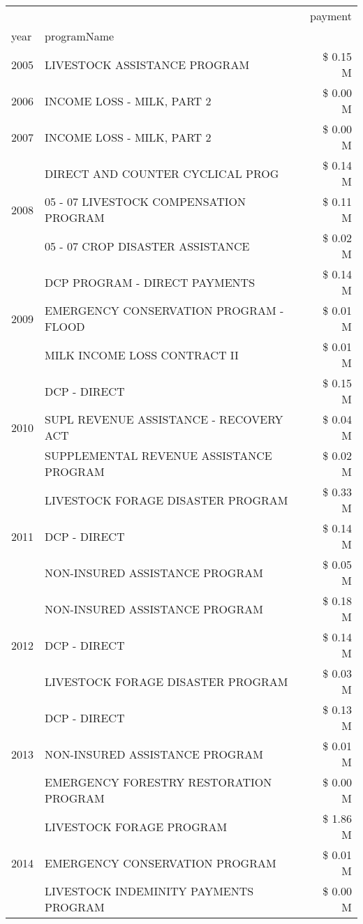 \begin{tabular}{llr}
\toprule
 &  & payment \\
year & programName &  \\
\midrule
2005 & LIVESTOCK ASSISTANCE PROGRAM & \$ 0.15 M \\
\cline{1-3}
2006 & INCOME LOSS - MILK, PART 2 & \$ 0.00 M \\
\cline{1-3}
2007 & INCOME LOSS - MILK, PART 2 & \$ 0.00 M \\
\cline{1-3}
\multirow[t]{3}{*}{2008} & DIRECT AND COUNTER CYCLICAL PROG & \$ 0.14 M \\
 & 05 - 07 LIVESTOCK COMPENSATION PROGRAM & \$ 0.11 M \\
 & 05 - 07 CROP DISASTER ASSISTANCE & \$ 0.02 M \\
\cline{1-3}
\multirow[t]{3}{*}{2009} & DCP PROGRAM - DIRECT PAYMENTS & \$ 0.14 M \\
 & EMERGENCY CONSERVATION PROGRAM - FLOOD & \$ 0.01 M \\
 & MILK INCOME LOSS CONTRACT II & \$ 0.01 M \\
\cline{1-3}
\multirow[t]{3}{*}{2010} & DCP - DIRECT & \$ 0.15 M \\
 & SUPL REVENUE ASSISTANCE - RECOVERY ACT & \$ 0.04 M \\
 & SUPPLEMENTAL REVENUE ASSISTANCE PROGRAM & \$ 0.02 M \\
\cline{1-3}
\multirow[t]{3}{*}{2011} & LIVESTOCK FORAGE DISASTER PROGRAM & \$ 0.33 M \\
 & DCP - DIRECT & \$ 0.14 M \\
 & NON-INSURED ASSISTANCE PROGRAM & \$ 0.05 M \\
\cline{1-3}
\multirow[t]{3}{*}{2012} & NON-INSURED ASSISTANCE PROGRAM & \$ 0.18 M \\
 & DCP - DIRECT & \$ 0.14 M \\
 & LIVESTOCK FORAGE DISASTER PROGRAM & \$ 0.03 M \\
\cline{1-3}
\multirow[t]{3}{*}{2013} & DCP - DIRECT & \$ 0.13 M \\
 & NON-INSURED ASSISTANCE PROGRAM & \$ 0.01 M \\
 & EMERGENCY FORESTRY RESTORATION PROGRAM & \$ 0.00 M \\
\cline{1-3}
\multirow[t]{3}{*}{2014} & LIVESTOCK FORAGE PROGRAM & \$ 1.86 M \\
 & EMERGENCY CONSERVATION PROGRAM & \$ 0.01 M \\
 & LIVESTOCK INDEMINITY PAYMENTS PROGRAM & \$ 0.00 M \\
\cline{1-3}

\end{tabular}
